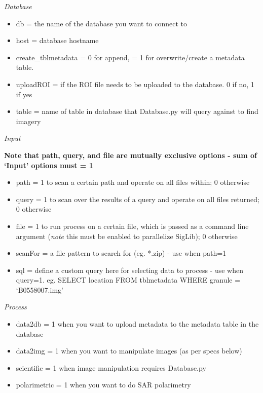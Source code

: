 \documentclass[letterpaper,10pt,openany,oneside]{sphinxmanual}
\begin{document}
\emph{Database}
\begin{itemize}
\item {} 
db = the name of the database you want to connect to

\item {} 
host = database hostname

\item {} 
create\_tblmetadata = 0 for append, = 1 for overwrite/create
a metadata table.

\item {} 
uploadROI = if the ROI file needs to be uploaded to the database. 0 if no, 1 if yes

\item {} 
table = name of table in database that Database.py will query
against to find imagery

\end{itemize}

\emph{Input}

\textbf{Note that path, query, and file are mutually exclusive options - sum of `Input'
options must = 1}
\begin{itemize}
\item {} 
path = 1 to scan a certain path and operate on all files within; 0
otherwise

\item {} 
query = 1 to scan over the results of a query and operate on all
files returned; 0 otherwise

\item {} 
file = 1 to run process on a certain file, which is passed as a
command line argument (\emph{note} this must be enabled to parallelize SigLib); 0
otherwise

\item {} 
scanFor = a file pattern to search for (eg. *.zip) - use when path=1

\item {} 
sql = define a custom query here for selecting data to process - use
when query=1. eg. SELECT location FROM tblmetadata WHERE granule =
`B0558007.img'

\end{itemize}

\emph{Process}
\begin{itemize}
\item {} 
data2db = 1 when you want to upload metadata to the metadata table in
the database

\item {} 
data2img = 1 when you want to manipulate images (as per specs below)

\item {} 
scientific = 1 when image manipulation requires Database.py

\item {} 
polarimetric = 1 when you want to do SAR polarimetry

\end{itemize}
\end{document}
